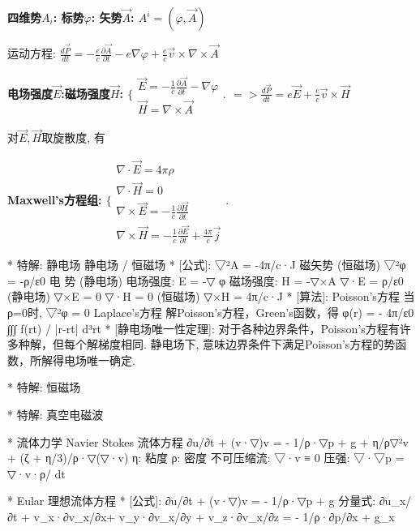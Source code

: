         \bf{四维势$A_{i}$: \quad 标势$\varphi$: \quad 矢势$\vec A$:}
            $A^{i}=(\varphi,\vec A)$
            
        运动方程:
            $\frac{d\vec P}{dt} = - \frac{e}{c} \frac{∂\vec A}{∂ t} - e \nabla \varphi + \frac{e}{c} \vec v \times \nabla \times \vec A$
            
        \bf{电场强度$\vec E$:\quad 磁场强度$\vec H$:}
            $
                \{ \begin{array}{ll}
                \vec E = -\frac{1}{c} \frac{∂ \vec A}{∂ t} - \nabla \varphi\\
                \vec H = \nabla \times \vec A
                \end{array} .
            $
            $=> \frac{d\vec P}{dt} = e \vec E + \frac{e}{c} \vec v \times \vec H$
            
        对$\vec E,\vec H$取旋散度, 有
        
        \bf{Maxwell's方程组}:
            $
                \{ \begin{array}{ll}
                \nabla \cdot \vec E = 4\pi\rho\\
                \nabla \cdot \vec H = 0\\
                \nabla \times \vec E = - \frac{1}{c} \frac{∂ \vec H}{∂ t}\\
                \nabla \times \vec H = - \frac{1}{c} \frac{∂ \vec E}{∂ t} + \frac{4\pi}{c}\vec j
                \end{array} .
            $


* 特解: 静电场
静电场  /  恒磁场
*	[公式]: 
		▽²A  = -4π/c·J		磁矢势 (恒磁场)
		▽²φ = -ρ/ε0			电  势 (静电场)
		电场强度: E = -▽ φ
		磁场强度: H = -▽×A
		▽·E = ρ/ε0			(静电场)
		▽×E = 0
		▽·H = 0				(恒磁场)
		▽×H = 4π/c·J
*	[算法]:	Poisson's方程		
		当ρ=0时, ▽²φ = 0		Laplace's方程
		解Poisson's方程，Green's函数，得 φ(r) = - 4π/ε0 ∫∫∫ f(rt) / |r-rt| d³rt
*	[静电场唯一性定理]:
		对于各种边界条件，Poisson's方程有许多种解，但每个解梯度相同.
		静电场下, 意味边界条件下满足Poisson's方程的势函数，所解得电场唯一确定.

* 特解: 恒磁场


* 特解: 真空电磁波



* 流体力学
    Navier Stokes 流体方程
    ∂\vec u/∂t + (\vec v·▽)\vec v =  - 1/ρ·▽p  + \vec g + η/ρ▽²\vec v + (ζ + η/3)/ρ·▽(▽·\vec v)
			η: 粘度    ρ: 密度
			不可压缩流: ▽·\vec v ≡ 0
			压强: ▽·▽p = ▽·v·ρ/ dt

*                   Eular 理想流体方程
*	[公式]: ∂\vec u/∂t + (\vec v·▽)\vec v = - 1/ρ·▽p + \vec g
		分量式:
			∂u_x/∂t + v_x·∂v_x/∂x+ v_y·∂v_x/∂y + v_z·∂v_x/∂z = - 1/ρ·∂p/∂x + g_x


